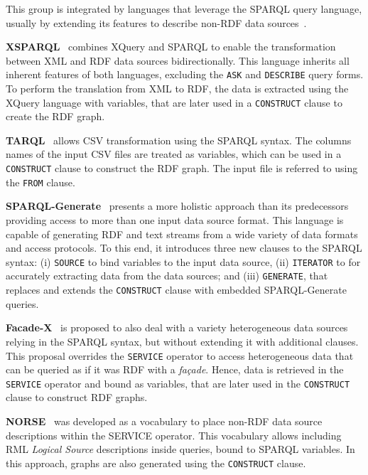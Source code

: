 This group is integrated by languages that leverage the SPARQL query language, usually by extending its features to describe non-RDF data sources~\parencite{harris2013sparql}. 


\noindent\textbf{XSPARQL}~\parencite{Bischof2012xsparql} combines XQuery and SPARQL to enable the transformation between XML and RDF data sources bidirectionally. This language inherits all inherent features of both languages, excluding the \texttt{ASK} and \texttt{DESCRIBE} query forms. To perform the translation from XML to RDF, the data is extracted using the XQuery language with variables, that are later used in a \texttt{CONSTRUCT} clause to create the RDF graph. 

\noindent\textbf{TARQL}~\parencite{tarql} allows CSV transformation using the SPARQL syntax. The columns names of the input CSV files are treated as variables, which can be used in a \texttt{CONSTRUCT} clause to construct the RDF graph. The input file is referred to using the \texttt{FROM} clause. 

\noindent\textbf{SPARQL-Generate}~\parencite{Lefrancois2017sparqlgenerate} presents a more holistic approach than its predecessors providing access to more than one input data source format. This language is capable of generating RDF and text streams from a wide variety of data formats and access protocols. To this end, it introduces three new clauses to the SPARQL syntax: (i) \texttt{SOURCE} to bind variables to the input data source, (ii) \texttt{ITERATOR} to for accurately extracting data from the data sources; and (iii) \texttt{GENERATE}, that replaces and extends the \texttt{CONSTRUCT} clause with embedded SPARQL-Generate queries. 

\noindent\textbf{Facade-X}~\parencite{daga2021facade} is proposed to also deal with a variety heterogeneous data sources relying in the SPARQL syntax, but without extending it with additional clauses. This proposal overrides the \texttt{SERVICE} operator to access heterogeneous data that can be queried as if it was RDF with a \textit{façade}. Hence, data is retrieved in the \texttt{SERVICE} operator and bound as variables, that are later used in the \texttt{CONSTRUCT} clause to construct RDF graphs. 

\noindent\textbf{NORSE}~\parencite{stadler2023spark} was developed as a vocabulary to place non-RDF data source descriptions within the SERVICE operator. This vocabulary allows including RML \textit{Logical Source} descriptions inside queries, bound to SPARQL variables. In this approach, graphs are also generated using the \texttt{CONSTRUCT} clause. 




